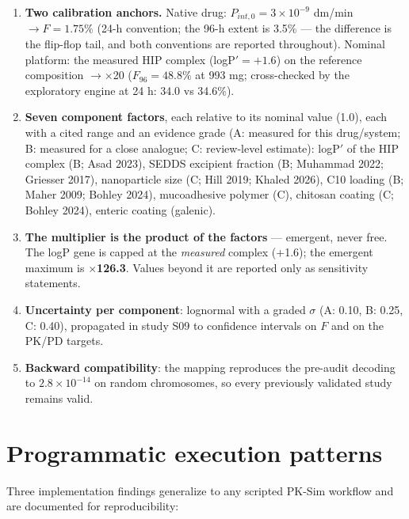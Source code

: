 \begin{enumerate}
\item \textbf{Two calibration anchors.} Native drug: $P_{int,0} = 3\times10^{-9}$ dm/min $\rightarrow F = 1.75\%$ (24-h convention; the 96-h extent is 3.5\% --- the difference is the flip-flop tail, and both conventions are reported throughout). Nominal platform: the measured HIP complex (logP$' = +1.6$) on the reference composition $\rightarrow \times$20 ($F_{96} = 48.8\%$ at 993 mg; cross-checked by the exploratory engine at 24 h: 34.0 vs 34.6\%).
\item \textbf{Seven component factors}, each relative to its nominal value (1.0), each with a cited range and an evidence grade (A: measured for this drug/system; B: measured for a close analogue; C: review-level estimate): logP$'$ of the HIP complex (B; Asad 2023), SEDDS excipient fraction (B; Muhammad 2022; Griesser 2017), nanoparticle size (C; Hill 2019; Khaled 2026), C10 loading (B; Maher 2009; Bohley 2024), mucoadhesive polymer (C), chitosan coating (C; Bohley 2024), enteric coating (galenic).
\item \textbf{The multiplier is the product of the factors} --- emergent, never free. The logP gene is capped at the \emph{measured} complex (+1.6); the emergent maximum is $\boldsymbol{\times}$\textbf{126.3}. Values beyond it are reported only as sensitivity statements.
\item \textbf{Uncertainty per component}: lognormal with a graded $\sigma$ (A: 0.10, B: 0.25, C: 0.40), propagated in study S09 to confidence intervals on $F$ and on the PK/PD targets.
\item \textbf{Backward compatibility}: the mapping reproduces the pre-audit decoding to $2.8\times10^{-14}$ on random chromosomes, so every previously validated study remains valid.
\end{enumerate}

\section{Programmatic execution patterns}
\label{sec:pksim-execution}

Three implementation findings generalize to any scripted PK-Sim workflow and are documented for reproducibility:

